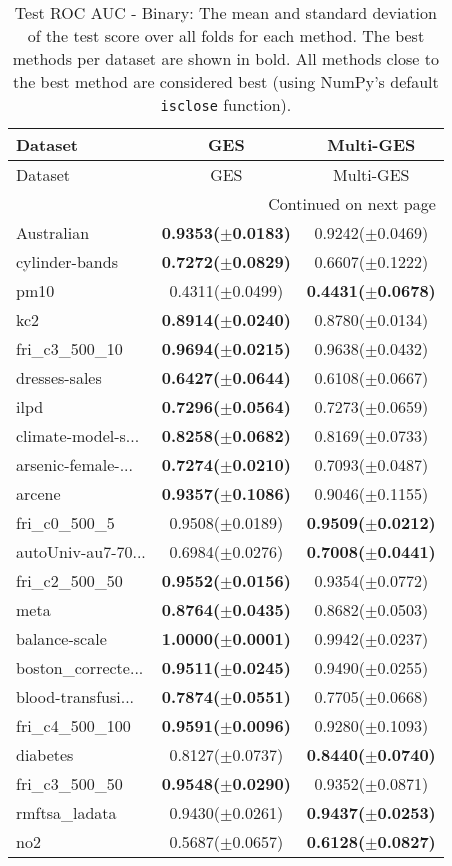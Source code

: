 \begin{longtable}{lcc}
\caption{Test ROC AUC - Binary: The mean and standard deviation of the test score over all folds for each method. The best methods per dataset are shown in bold. All methods close to the best method are considered best (using NumPy’s default \texttt{isclose} function).}
\label{tab:results} \\ 
\toprule
Dataset & GES & Multi-GES \\
\midrule
\endfirsthead
\toprule
Dataset & GES & Multi-GES \\
\midrule
\endhead
\midrule
\multicolumn{3}{r}{Continued on next page} \\
\midrule
\endfoot
\bottomrule
\endlastfoot
Australian & \textbf{0.9353($\pm$0.0183)} & 0.9242($\pm$0.0469) \\
cylinder-bands & \textbf{0.7272($\pm$0.0829)} & 0.6607($\pm$0.1222) \\
pm10 & 0.4311($\pm$0.0499) & \textbf{0.4431($\pm$0.0678)} \\
kc2 & \textbf{0.8914($\pm$0.0240)} & 0.8780($\pm$0.0134) \\
fri\_c3\_500\_10 & \textbf{0.9694($\pm$0.0215)} & 0.9638($\pm$0.0432) \\
dresses-sales & \textbf{0.6427($\pm$0.0644)} & 0.6108($\pm$0.0667) \\
ilpd & \textbf{0.7296($\pm$0.0564)} & 0.7273($\pm$0.0659) \\
climate-model-s... & \textbf{0.8258($\pm$0.0682)} & 0.8169($\pm$0.0733) \\
arsenic-female-... & \textbf{0.7274($\pm$0.0210)} & 0.7093($\pm$0.0487) \\
arcene & \textbf{0.9357($\pm$0.1086)} & 0.9046($\pm$0.1155) \\
fri\_c0\_500\_5 & 0.9508($\pm$0.0189) & \textbf{0.9509($\pm$0.0212)} \\
autoUniv-au7-70... & 0.6984($\pm$0.0276) & \textbf{0.7008($\pm$0.0441)} \\
fri\_c2\_500\_50 & \textbf{0.9552($\pm$0.0156)} & 0.9354($\pm$0.0772) \\
meta & \textbf{0.8764($\pm$0.0435)} & 0.8682($\pm$0.0503) \\
balance-scale & \textbf{1.0000($\pm$0.0001)} & 0.9942($\pm$0.0237) \\
boston\_correcte... & \textbf{0.9511($\pm$0.0245)} & 0.9490($\pm$0.0255) \\
blood-transfusi... & \textbf{0.7874($\pm$0.0551)} & 0.7705($\pm$0.0668) \\
fri\_c4\_500\_100 & \textbf{0.9591($\pm$0.0096)} & 0.9280($\pm$0.1093) \\
diabetes & 0.8127($\pm$0.0737) & \textbf{0.8440($\pm$0.0740)} \\
fri\_c3\_500\_50 & \textbf{0.9548($\pm$0.0290)} & 0.9352($\pm$0.0871) \\
rmftsa\_ladata & 0.9430($\pm$0.0261) & \textbf{0.9437($\pm$0.0253)} \\
no2 & 0.5687($\pm$0.0657) & \textbf{0.6128($\pm$0.0827)} \\
\bottomrule
\end{longtable}
